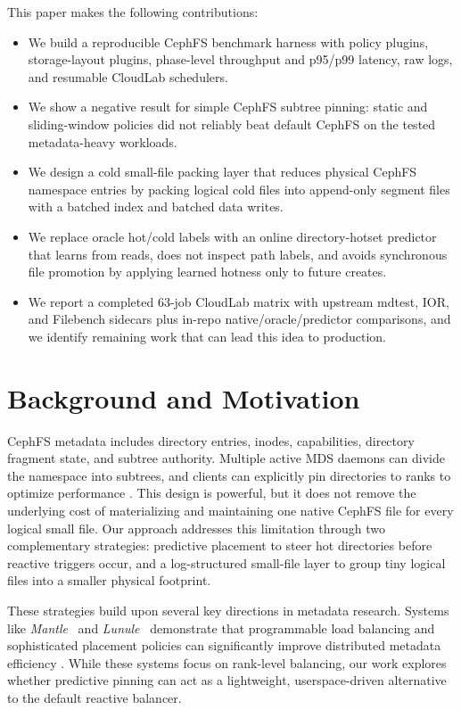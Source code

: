 \documentclass[letterpaper,twocolumn,10pt]{article}
\begin{document}
This paper makes the following contributions:
\begin{itemize}[leftmargin=*]
\item We build a reproducible CephFS benchmark harness with policy plugins, storage-layout plugins, phase-level throughput and p95/p99 latency, raw logs, and resumable CloudLab schedulers.
\item We show a negative result for simple CephFS subtree pinning: static and sliding-window policies did not reliably beat default CephFS on the tested
metadata-heavy workloads.
\item We design a cold small-file packing layer that reduces physical CephFS namespace entries by packing logical cold files into append-only segment files
with a batched index and batched data writes.
\item We replace oracle hot/cold labels with an online directory-hotset predictor that learns from reads, does not inspect path labels, and avoids synchronous file promotion by applying learned hotness only to future creates.
\item We report a completed 63-job CloudLab matrix with upstream mdtest, IOR, and Filebench sidecars plus in-repo native/oracle/predictor comparisons, and we identify remaining work that can lead this idea to production.
\end{itemize}

\section{Background and Motivation}

CephFS metadata includes directory entries, inodes, capabilities, directory fragment state, and subtree authority. Multiple active MDS daemons can divide the namespace into subtrees, and clients can explicitly pin directories to ranks to optimize performance \cite{cephfs-multimds, cephfs-pinning}. This design is powerful, but it does not remove the underlying cost of materializing and maintaining one native CephFS file for every logical small file. Our approach addresses this limitation through two complementary strategies: predictive placement to steer hot directories before reactive triggers occur, and a log-structured small-file layer to group tiny logical files into a smaller physical footprint.

These strategies build upon several key directions in metadata research. Systems like \emph{Mantle}~\cite{mantle} and \emph{Lunule}~\cite{lunule} demonstrate that programmable load balancing and sophisticated placement policies can significantly improve distributed metadata efficiency \cite{mantle, lunule}. While these systems focus on rank-level balancing, our work explores whether predictive pinning can act as a lightweight, userspace-driven alternative to the default reactive balancer. 
\end{document}
